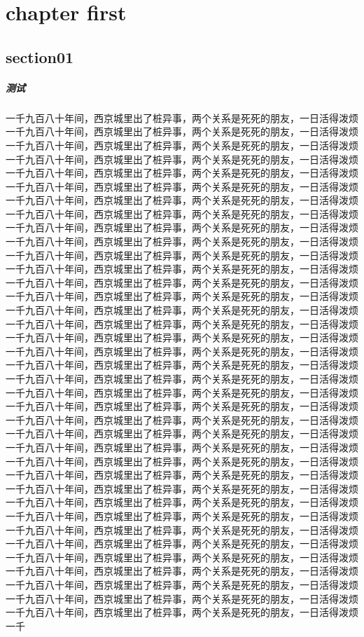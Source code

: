\chapter{chapter first}
\section{section01}
\paragraph{测试}
一千九百八十年间，西京城里出了桩异事，两个关系是死死的朋友，一日活得泼烦一千九百八十年间，西京城里出了桩异事，两个关系是死死的朋友，一日活得泼烦一千九百八十年间，西京城里出了桩异事，两个关系是死死的朋友，一日活得泼烦一千九百八十年间，西京城里出了桩异事，两个关系是死死的朋友，一日活得泼烦一千九百八十年间，西京城里出了桩异事，两个关系是死死的朋友，一日活得泼烦一千九百八十年间，西京城里出了桩异事，两个关系是死死的朋友，一日活得泼烦一千九百八十年间，西京城里出了桩异事，两个关系是死死的朋友，一日活得泼烦一千九百八十年间，西京城里出了桩异事，两个关系是死死的朋友，一日活得泼烦一千九百八十年间，西京城里出了桩异事，两个关系是死死的朋友，一日活得泼烦一千九百八十年间，西京城里出了桩异事，两个关系是死死的朋友，一日活得泼烦一千九百八十年间，西京城里出了桩异事，两个关系是死死的朋友，一日活得泼烦一千九百八十年间，西京城里出了桩异事，两个关系是死死的朋友，一日活得泼烦一千九百八十年间，西京城里出了桩异事，两个关系是死死的朋友，一日活得泼烦一千九百八十年间，西京城里出了桩异事，两个关系是死死的朋友，一日活得泼烦一千九百八十年间，西京城里出了桩异事，两个关系是死死的朋友，一日活得泼烦一千九百八十年间，西京城里出了桩异事，两个关系是死死的朋友，一日活得泼烦一千九百八十年间，西京城里出了桩异事，两个关系是死死的朋友，一日活得泼烦一千九百八十年间，西京城里出了桩异事，两个关系是死死的朋友，一日活得泼烦一千九百八十年间，西京城里出了桩异事，两个关系是死死的朋友，一日活得泼烦一千九百八十年间，西京城里出了桩异事，两个关系是死死的朋友，一日活得泼烦一千九百八十年间，西京城里出了桩异事，两个关系是死死的朋友，一日活得泼烦一千九百八十年间，西京城里出了桩异事，两个关系是死死的朋友，一日活得泼烦一千九百八十年间，西京城里出了桩异事，两个关系是死死的朋友，一日活得泼烦一千九百八十年间，西京城里出了桩异事，两个关系是死死的朋友，一日活得泼烦一千九百八十年间，西京城里出了桩异事，两个关系是死死的朋友，一日活得泼烦一千九百八十年间，西京城里出了桩异事，两个关系是死死的朋友，一日活得泼烦一千九百八十年间，西京城里出了桩异事，两个关系是死死的朋友，一日活得泼烦一千九百八十年间，西京城里出了桩异事，两个关系是死死的朋友，一日活得泼烦一千九百八十年间，西京城里出了桩异事，两个关系是死死的朋友，一日活得泼烦一千九百八十年间，西京城里出了桩异事，两个关系是死死的朋友，一日活得泼烦一千九百八十年间，西京城里出了桩异事，两个关系是死死的朋友，一日活得泼烦一千九百八十年间，西京城里出了桩异事，两个关系是死死的朋友，一日活得泼烦一千九百八十年间，西京城里出了桩异事，两个关系是死死的朋友，一日活得泼烦一千九百八十年间，西京城里出了桩异事，两个关系是死死的朋友，一日活得泼烦一千九百八十年间，西京城里出了桩异事，两个关系是死死的朋友，一日活得泼烦一千九百八十年间，西京城里出了桩异事，两个关系是死死的朋友，一日活得泼烦一千九百八十年间，西京城里出了桩异事，两个关系是死死的朋友，一日活得泼烦一千